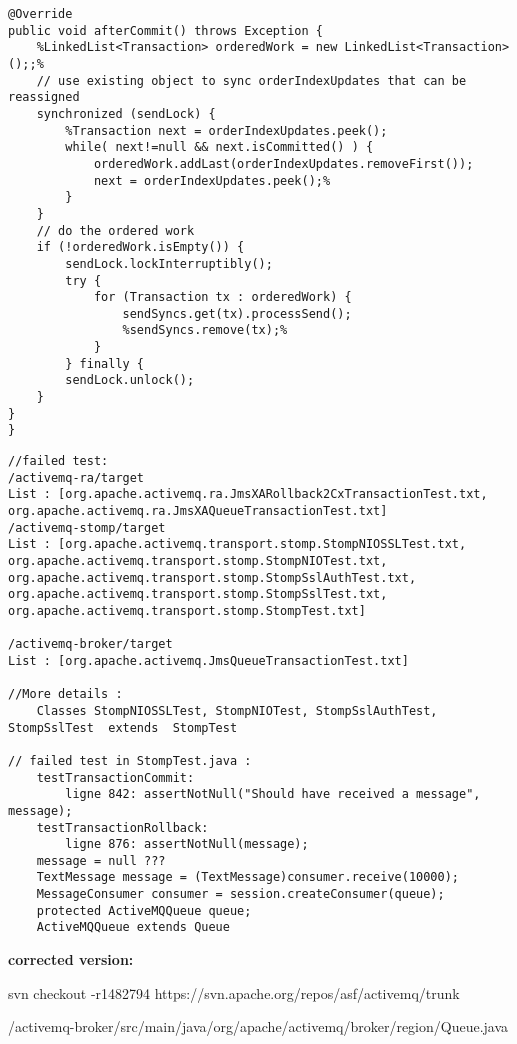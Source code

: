 \documentclass{article}
\begin{document}
\begin{lstlisting}[frame=single]
@Override
public void afterCommit() throws Exception {
	%LinkedList<Transaction> orderedWork = new LinkedList<Transaction>();;%
	// use existing object to sync orderIndexUpdates that can be reassigned
	synchronized (sendLock) {
		%Transaction next = orderIndexUpdates.peek();
		while( next!=null && next.isCommitted() ) {
			orderedWork.addLast(orderIndexUpdates.removeFirst());
			next = orderIndexUpdates.peek();%
		}
	}
	// do the ordered work
	if (!orderedWork.isEmpty()) {
		sendLock.lockInterruptibly();
		try {
			for (Transaction tx : orderedWork) {
				sendSyncs.get(tx).processSend();
				%sendSyncs.remove(tx);%
			}
		} finally {
		sendLock.unlock();
	}
}
}
\end{lstlisting}
\begin{lstlisting}[frame=single]
//failed test:
/activemq-ra/target
List : [org.apache.activemq.ra.JmsXARollback2CxTransactionTest.txt, 
org.apache.activemq.ra.JmsXAQueueTransactionTest.txt]
/activemq-stomp/target
List : [org.apache.activemq.transport.stomp.StompNIOSSLTest.txt, 
org.apache.activemq.transport.stomp.StompNIOTest.txt, 
org.apache.activemq.transport.stomp.StompSslAuthTest.txt, 
org.apache.activemq.transport.stomp.StompSslTest.txt, 
org.apache.activemq.transport.stomp.StompTest.txt]

/activemq-broker/target
List : [org.apache.activemq.JmsQueueTransactionTest.txt]

//More details :
	Classes StompNIOSSLTest, StompNIOTest, StompSslAuthTest, StompSslTest  extends	StompTest

// failed test in StompTest.java :
	testTransactionCommit: 
		ligne 842: assertNotNull("Should have received a message", message);
	testTransactionRollback: 
		ligne 876: assertNotNull(message);
	message = null ???
	TextMessage message = (TextMessage)consumer.receive(10000);
	MessageConsumer consumer = session.createConsumer(queue);
	protected ActiveMQQueue queue;
	ActiveMQQueue extends Queue

\end{lstlisting}
\clearpage

\textbf{corrected version:}

svn checkout -r1482794 https://svn.apache.org/repos/asf/activemq/trunk

/activemq-broker/src/main/java/org/apache/activemq/broker/region/Queue.java
\end{document}
